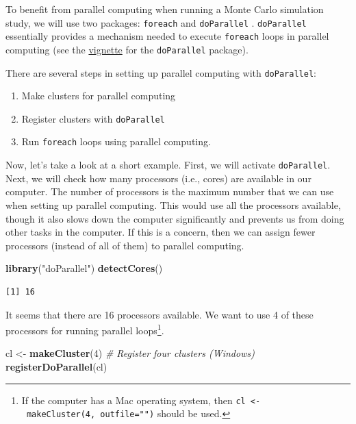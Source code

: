 \documentclass[
]{book}
\newenvironment{Shaded}{\begin{snugshade}}{\end{snugshade}}
\newcommand{\CommentTok}[1]{\textcolor[rgb]{0.56,0.35,0.01}{\textit{#1}}}
\newcommand{\DecValTok}[1]{\textcolor[rgb]{0.00,0.00,0.81}{#1}}
\newcommand{\KeywordTok}[1]{\textcolor[rgb]{0.13,0.29,0.53}{\textbf{#1}}}
\newcommand{\NormalTok}[1]{#1}
\newcommand{\StringTok}[1]{\textcolor[rgb]{0.31,0.60,0.02}{#1}}
\providecommand{\tightlist}{%
  \setlength{\itemsep}{0pt}\setlength{\parskip}{0pt}}
\begin{document}
To benefit from parallel computing when running a Monte Carlo simulation study, we will use two packages: \texttt{foreach} \citep{R-foreach} and \texttt{doParallel} \citep{R-doParallel}. \texttt{doParallel} essentially provides a mechanism
needed to execute \texttt{foreach} loops in parallel computing (see the \href{https://cran.r-project.org/web/packages/doParallel/vignettes/gettingstartedParallel.pdf}{vignette} for the \texttt{doParallel} package).

There are several steps in setting up parallel computing with \texttt{doParallel}:

\begin{enumerate}
\def\labelenumi{\arabic{enumi}.}
\tightlist
\item
  Make clusters for parallel computing
\item
  Register clusters with \texttt{doParallel}
\item
  Run \texttt{foreach} loops using parallel computing.
\end{enumerate}

Now, let's take a look at a short example. First, we will activate \texttt{doParallel}. Next, we will check how many processors (i.e., cores) are available in our computer. The number of processors is the maximum number that we can use when setting up parallel computing. This would use all the processors available, though it also slows down the computer significantly and prevents us from doing other tasks in the computer. If this is a concern, then we can assign fewer processors (instead of all of them) to parallel computing.

\begin{Shaded}
\begin{Highlighting}[]
\KeywordTok{library}\NormalTok{(}\StringTok{"doParallel"}\NormalTok{)}
\KeywordTok{detectCores}\NormalTok{()}
\end{Highlighting}
\end{Shaded}

\begin{verbatim}
[1] 16
\end{verbatim}

It seems that there are 16 processors available. We want to use 4 of these processors for running parallel loops\footnote{If the computer has a Mac operating system, then \texttt{cl\ \textless{}-\ makeCluster(4,\ outfile="")} should be used.}.

\begin{Shaded}
\begin{Highlighting}[]
\NormalTok{cl <-}\StringTok{ }\KeywordTok{makeCluster}\NormalTok{(}\DecValTok{4}\NormalTok{) }\CommentTok{# Register four clusters (Windows)}
\KeywordTok{registerDoParallel}\NormalTok{(cl)}
\end{Highlighting}
\end{Shaded}
\end{document}
